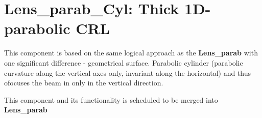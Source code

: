 \section{Lens\_parab\_Cyl: Thick 1D-parabolic CRL}
\label{s:lens-parab-cyl}
This component is based on the same logical approach as the
\textbf{Lens\_parab} with one significant difference - geometrical surface.
Parabolic cylinder (parabolic curvature along the vertical axes only, invariant
along the horizontal) and thus ofocuses the beam in only in the vertical direction.

This component and its functionality is scheduled to be merged into \textbf{Lens\_parab}

